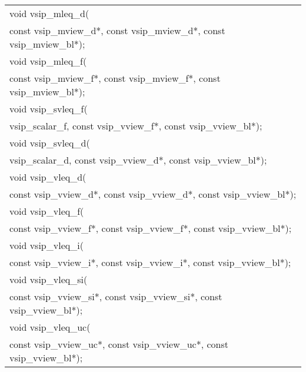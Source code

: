 \\\cvsiplh
\afh
{
\ttfamily
\\\hspace*{.04\textwidth}\begin{tabular}[H]{l}
void vsip\_mleq\_d(\\*\hspace{1cm}const vsip\_mview\_d*, const vsip\_mview\_d*, const vsip\_mview\_bl*);\\
void vsip\_mleq\_f(\\*\hspace{1cm}const vsip\_mview\_f*, const vsip\_mview\_f*, const vsip\_mview\_bl*);\\
void vsip\_svleq\_f(\\*\hspace{1cm}vsip\_scalar\_f, const vsip\_vview\_f*, const vsip\_vview\_bl*);\\
void vsip\_svleq\_d(\\*\hspace{1cm}vsip\_scalar\_d, const vsip\_vview\_d*, const vsip\_vview\_bl*);\\
void vsip\_vleq\_d(\\*\hspace{1cm}const vsip\_vview\_d*, const vsip\_vview\_d*, const vsip\_vview\_bl*);\\
void vsip\_vleq\_f(\\*\hspace{1cm}const vsip\_vview\_f*, const vsip\_vview\_f*, const vsip\_vview\_bl*);\\
void vsip\_vleq\_i(\\*\hspace{1cm}const vsip\_vview\_i*, const vsip\_vview\_i*, const vsip\_vview\_bl*);\\
void vsip\_vleq\_si(\\*\hspace{1cm}const vsip\_vview\_si*, const vsip\_vview\_si*, const vsip\_vview\_bl*);\\
void vsip\_vleq\_uc(\\*\hspace{1cm}const vsip\_vview\_uc*, const vsip\_vview\_uc*, const vsip\_vview\_bl*);\\
\end{tabular}
}
\\\pyjvsiph
{}
